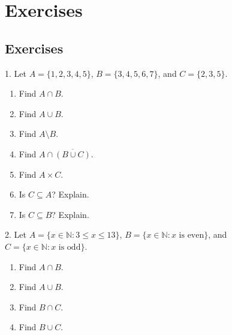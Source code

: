 \documentclass[10pt,]{book}
\theoremstyle{plain}
\theoremstyle{definition}
\numberwithin{equation}{chapter}
\def\N{\mathbb N}
\def\st{:}
\begin{document}
\typeout{************************************************}
\typeout{************************************************}
\section[Exercises]{Exercises}\label{section-3}
\typeout{************************************************}
\typeout{************************************************}
\subsection[Exercises]{Exercises}\label{exercises_intro-sets}
\begin{exerciselist}
\item[1.]\hypertarget{exercise-11}{}
          Let \(A = \{1,2,3,4,5\}\), \(B = \{3,4,5,6,7\}\), and \(C = \{2,3,5\}\).
\leavevmode%
\begin{enumerate}[label=(\alph*)]
\item\hypertarget{li-83}{} Find \(A \cap B\). %
\item\hypertarget{li-84}{} Find \(A \cup B\). %
\item\hypertarget{li-85}{} Find \(A \setminus B\). %
\item\hypertarget{li-86}{} Find \(A \cap \overline{(B \cup C)}\). %
\item\hypertarget{li-87}{} Find \(A \times C\). %
\item\hypertarget{li-88}{} Is \(C \subseteq A\)? Explain. %
\item\hypertarget{li-89}{} Is \(C \subseteq B\)? Explain. %
\end{enumerate}
\par\smallskip
\item[2.]\hypertarget{exercise-12}{}
          Let \(A = \{x \in \N \st 3 \le x \le 13\}\), \(B = \{x \in \N \st x \mbox{ is even} \}\), and \(C = \{x \in \N \st x \mbox{ is odd} \}\).
\leavevmode%
\begin{enumerate}[label=(\alph*)]
\item\hypertarget{li-97}{} Find \(A \cap B\). %
\item\hypertarget{li-98}{} Find \(A \cup B\). %
\item\hypertarget{li-99}{} Find \(B \cap C\). %
\item\hypertarget{li-100}{} Find \(B \cup C\). %
\end{enumerate}
\par\smallskip

\end{exerciselist}
\end{document}

